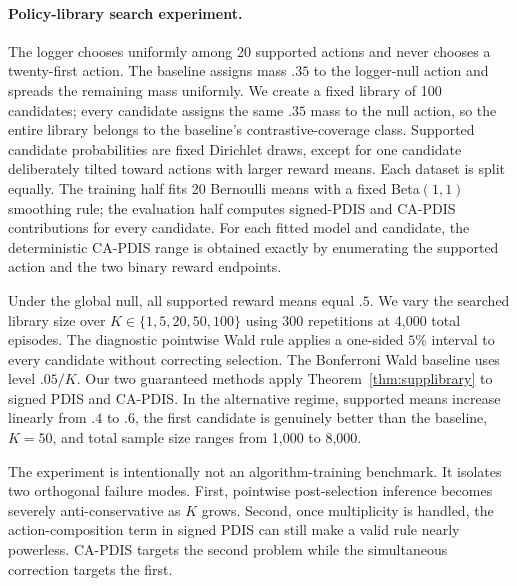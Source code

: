 \paragraph{Policy-library search experiment.}
The logger chooses uniformly among 20 supported actions and never chooses a twenty-first action. The baseline assigns mass $.35$ to the logger-null action and spreads the remaining mass uniformly. We create a fixed library of 100 candidates; every candidate assigns the same $.35$ mass to the null action, so the entire library belongs to the baseline's contrastive-coverage class. Supported candidate probabilities are fixed Dirichlet draws, except for one candidate deliberately tilted toward actions with larger reward means. Each dataset is split equally. The training half fits 20 Bernoulli means with a fixed Beta$(1,1)$ smoothing rule; the evaluation half computes signed-PDIS and CA-PDIS contributions for every candidate. For each fitted model and candidate, the deterministic CA-PDIS range is obtained exactly by enumerating the supported action and the two binary reward endpoints.

Under the global null, all supported reward means equal $.5$. We vary the searched library size over $K\in\{1,5,20,50,100\}$ using 300 repetitions at 4,000 total episodes. The diagnostic pointwise Wald rule applies a one-sided $5\%$ interval to every candidate without correcting selection. The Bonferroni Wald baseline uses level $.05/K$. Our two guaranteed methods apply Theorem~\ref{thm:supplibrary} to signed PDIS and CA-PDIS. In the alternative regime, supported means increase linearly from $.4$ to $.6$, the first candidate is genuinely better than the baseline, $K=50$, and total sample size ranges from 1,000 to 8,000.

The experiment is intentionally not an algorithm-training benchmark. It isolates two orthogonal failure modes. First, pointwise post-selection inference becomes severely anti-conservative as $K$ grows. Second, once multiplicity is handled, the action-composition term in signed PDIS can still make a valid rule nearly powerless. CA-PDIS targets the second problem while the simultaneous correction targets the first.
